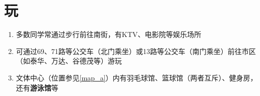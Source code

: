 \section[玩]{玩}
\begin{enumerate}
    \item 多数同学常通过步行前往南街，有KTV、电影院等娱乐场所
    \item 可通过69、71路等公交车（北门乘坐）或13路等公交车（南门乘坐）前往市区（如泰华、万达、谷德茂等）游玩
    \item 文体中心（位置参见\uline{\ref{map_a}}）内有羽毛球馆、篮球馆（两者互斥）、健身房，还有\textbf{游泳馆}等\footnotemark
\end{enumerate}